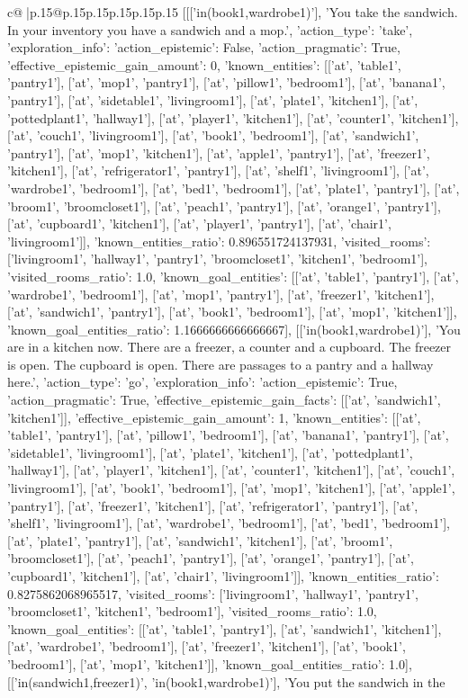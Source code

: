 \documentclass{article}
\begin{document}
{\begin{supertabular}{c@{$\;$}|p{.15\linewidth}@{}p{.15\linewidth}p{.15\linewidth}p{.15\linewidth}p{.15\linewidth}p{.15\linewidth}}
{{{	 [[['in(book1,wardrobe1)'], 'You take the sandwich. In your inventory you have a sandwich and a mop.', {'action_type': 'take', 'exploration_info': {'action_epistemic': False, 'action_pragmatic': True, 'effective_epistemic_gain_amount': 0, 'known_entities': [['at', 'table1', 'pantry1'], ['at', 'mop1', 'pantry1'], ['at', 'pillow1', 'bedroom1'], ['at', 'banana1', 'pantry1'], ['at', 'sidetable1', 'livingroom1'], ['at', 'plate1', 'kitchen1'], ['at', 'pottedplant1', 'hallway1'], ['at', 'player1', 'kitchen1'], ['at', 'counter1', 'kitchen1'], ['at', 'couch1', 'livingroom1'], ['at', 'book1', 'bedroom1'], ['at', 'sandwich1', 'pantry1'], ['at', 'mop1', 'kitchen1'], ['at', 'apple1', 'pantry1'], ['at', 'freezer1', 'kitchen1'], ['at', 'refrigerator1', 'pantry1'], ['at', 'shelf1', 'livingroom1'], ['at', 'wardrobe1', 'bedroom1'], ['at', 'bed1', 'bedroom1'], ['at', 'plate1', 'pantry1'], ['at', 'broom1', 'broomcloset1'], ['at', 'peach1', 'pantry1'], ['at', 'orange1', 'pantry1'], ['at', 'cupboard1', 'kitchen1'], ['at', 'player1', 'pantry1'], ['at', 'chair1', 'livingroom1']], 'known_entities_ratio': 0.896551724137931, 'visited_rooms': ['livingroom1', 'hallway1', 'pantry1', 'broomcloset1', 'kitchen1', 'bedroom1'], 'visited_rooms_ratio': 1.0, 'known_goal_entities': [['at', 'table1', 'pantry1'], ['at', 'wardrobe1', 'bedroom1'], ['at', 'mop1', 'pantry1'], ['at', 'freezer1', 'kitchen1'], ['at', 'sandwich1', 'pantry1'], ['at', 'book1', 'bedroom1'], ['at', 'mop1', 'kitchen1']], 'known_goal_entities_ratio': 1.1666666666666667}}], [['in(book1,wardrobe1)'], 'You are in a kitchen now. There are a freezer, a counter and a cupboard. The freezer is open. The cupboard is open. There are passages to a pantry and a hallway here.', {'action_type': 'go', 'exploration_info': {'action_epistemic': True, 'action_pragmatic': True, 'effective_epistemic_gain_facts': [['at', 'sandwich1', 'kitchen1']], 'effective_epistemic_gain_amount': 1, 'known_entities': [['at', 'table1', 'pantry1'], ['at', 'pillow1', 'bedroom1'], ['at', 'banana1', 'pantry1'], ['at', 'sidetable1', 'livingroom1'], ['at', 'plate1', 'kitchen1'], ['at', 'pottedplant1', 'hallway1'], ['at', 'player1', 'kitchen1'], ['at', 'counter1', 'kitchen1'], ['at', 'couch1', 'livingroom1'], ['at', 'book1', 'bedroom1'], ['at', 'mop1', 'kitchen1'], ['at', 'apple1', 'pantry1'], ['at', 'freezer1', 'kitchen1'], ['at', 'refrigerator1', 'pantry1'], ['at', 'shelf1', 'livingroom1'], ['at', 'wardrobe1', 'bedroom1'], ['at', 'bed1', 'bedroom1'], ['at', 'plate1', 'pantry1'], ['at', 'sandwich1', 'kitchen1'], ['at', 'broom1', 'broomcloset1'], ['at', 'peach1', 'pantry1'], ['at', 'orange1', 'pantry1'], ['at', 'cupboard1', 'kitchen1'], ['at', 'chair1', 'livingroom1']], 'known_entities_ratio': 0.8275862068965517, 'visited_rooms': ['livingroom1', 'hallway1', 'pantry1', 'broomcloset1', 'kitchen1', 'bedroom1'], 'visited_rooms_ratio': 1.0, 'known_goal_entities': [['at', 'table1', 'pantry1'], ['at', 'sandwich1', 'kitchen1'], ['at', 'wardrobe1', 'bedroom1'], ['at', 'freezer1', 'kitchen1'], ['at', 'book1', 'bedroom1'], ['at', 'mop1', 'kitchen1']], 'known_goal_entities_ratio': 1.0}}], [['in(sandwich1,freezer1)', 'in(book1,wardrobe1)'], 'You put the sandwich in the }}}
\end{supertabular}}
\end{document}
